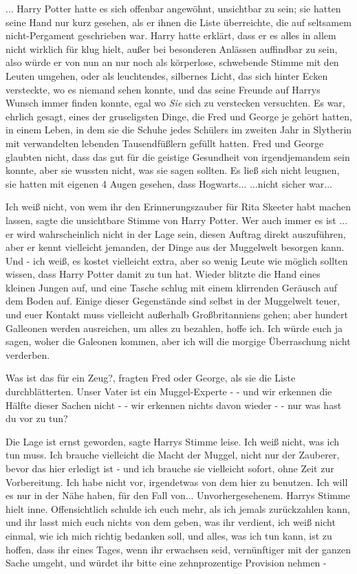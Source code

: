 ... Harry Potter hatte es sich offenbar angewöhnt, unsichtbar zu sein; sie
hatten seine Hand nur kurz gesehen, als er ihnen die Liste überreichte, die auf
seltsamem nicht-Pergament geschrieben war. Harry hatte erklärt, dass er es alles
in allem nicht wirklich für klug hielt, außer bei besonderen Anlässen auffindbar
zu sein, also würde er von nun an nur noch als körperlose, schwebende Stimme mit
den Leuten umgehen, oder als leuchtendes, silbernes Licht, das sich hinter Ecken
versteckte, wo es niemand sehen konnte, und das seine Freunde auf Harrys Wunsch
immer finden konnte, egal wo \emph{Sie} sich zu verstecken versuchten. Es war,
ehrlich gesagt, eines der gruseligsten Dinge, die Fred und George je gehört
hatten, in einem Leben, in dem sie die Schuhe jedes Schülers im zweiten Jahr in
Slytherin mit verwandelten lebenden Tausendfüßlern gefüllt hatten. Fred und
George glaubten nicht, dass das gut für die geistige Gesundheit von
irgendjemandem sein konnte, aber sie wussten nicht, was sie sagen sollten. Es
ließ sich nicht leugnen, sie hatten mit eigenen 4 Augen gesehen, dass
Hogwarts... ...nicht sicher war...

\glqq Ich weiß nicht, von wem ihr den Erinnerungszauber für Rita Skeeter habt
machen lassen\grqq{}, sagte die unsichtbare Stimme von Harry Potter. \glqq Wer
auch immer es ist ... er wird wahrscheinlich nicht in der Lage sein, diesen
Auftrag direkt auszuführen, aber er kennt vielleicht jemanden, der Dinge aus der
Muggelwelt besorgen kann. Und - ich weiß, es kostet vielleicht extra, aber so
wenig Leute wie möglich sollten wissen, dass Harry Potter damit zu tun
hat.\grqq{} Wieder blitzte die Hand eines kleinen Jungen auf, und eine Tasche
schlug mit einem klirrenden Geräusch auf dem Boden auf. \glqq Einige dieser
Gegenstände sind selbst in der Muggelwelt teuer, und euer Kontakt muss
vielleicht außerhalb Großbritanniens gehen; aber hundert Galleonen werden
ausreichen, um alles zu bezahlen, hoffe ich. Ich würde euch ja sagen, woher die
Galeonen kommen, aber ich will die morgige Überraschung nicht verderben.\grqq{}

\glqq Was ist das für ein Zeug?\grqq{}, fragten Fred oder George, als sie die
Liste durchblätterten. \glqq Unser Vater ist ein Muggel-Experte -\grqq{} \glqq -
und wir erkennen die Hälfte dieser Sachen nicht -\grqq{} \glqq - wir erkennen
nichts davon wieder -\grqq{} \glqq - nur was hast du vor zu tun?\grqq{}

\glqq Die Lage ist ernst geworden\grqq{}, sagte Harrys Stimme leise. \glqq Ich
weiß nicht, was ich tun muss. Ich brauche vielleicht die Macht der Muggel, nicht
nur der Zauberer, bevor das hier erledigt ist - und ich brauche sie vielleicht
sofort, ohne Zeit zur Vorbereitung. Ich habe nicht vor, irgendetwas von dem hier
zu benutzen. Ich will es nur in der Nähe haben, für den Fall von...
Unvorhergesehenem.\grqq{} Harrys Stimme hielt inne. \glqq Offensichtlich schulde
ich euch mehr, als ich jemals zurückzahlen kann, und ihr lasst mich euch nichts
von dem geben, was ihr verdient, ich weiß nicht einmal, wie ich mich richtig
bedanken soll, und alles, was ich tun kann, ist zu hoffen, dass ihr eines Tages,
wenn ihr erwachsen seid, vernünftiger mit der ganzen Sache umgeht, und würdet
ihr bitte eine zehnprozentige Provision nehmen -\grqq{}

